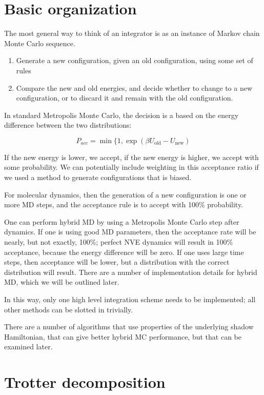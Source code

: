 \documentclass[11pt,a4paper,twoside]{article}
\begin{document}
\section{Basic organization}

The most general way to think of an integrator is as an instance of
Markov chain Monte Carlo sequence.
\begin{enumerate}
\item Generate a new configuration, given an old configuration, using some set of rules
\item Compare the new and old energies, and decide whether to change
  to a new configuration, or to discard it and remain with the old
  configuration.
\end{enumerate}

In standard Metropolis Monte Carlo, the decision is a based on the
energy difference between the two distributions:

\[P_{acc} = \min\{1,\exp(\beta U_{\mathrm{old}} - U_{\mathrm{new}}) \]

If the new energy is lower, we accept, if the new energy is higher, we
accept with some probability. We can potentially include weighting in
this acceptance ratio if we used a method to generate configurations
that is biased.

For molecular dynamics, then the generation of a new configuration is
one or more MD steps, and the acceptance rule is to accept with 100\%
probability.

One can perform hybrid MD by using a Metropolis Monte Carlo step after
dynamics.  If one is using good MD parameters, then the acceptance
rate will be nearly, but not exactly, 100\%; perfect NVE dynamics will
result in 100\% acceptance, because the energy difference will be
zero.  If one uses large time steps, then acceptance will be lower,
but a distribution with the correct distribution will result.  There
are a number of implementation details for hybrid MD, which we will be
outlined later.

In this way, only one high level integration scheme needs to be
implemented; all other methods can be slotted in trivially.

There are a number of algorithms that use properties of the underlying
shadow Hamiltonian, that can give better hybrid MC performance, but
that can be examined later.

\section{Trotter decomposition}
\end{document}

